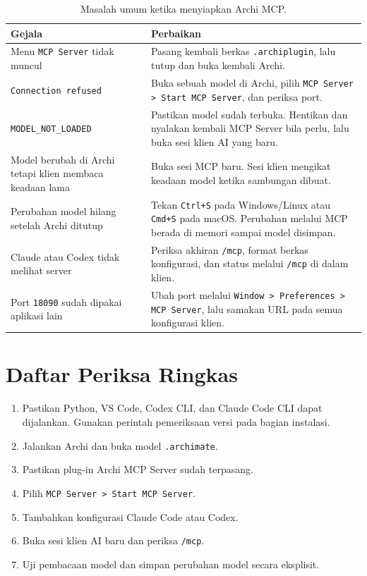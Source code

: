 \begin{table}[htbp]
\centering
\scriptsize
\caption{Masalah umum ketika menyiapkan Archi MCP.}
\label{tab:archi-mcp-troubleshooting}
\begin{tabularx}{\textwidth}{@{}p{} X@{}}
\hline
\textbf{Gejala} & \textbf{Perbaikan} \\
\hline
Menu \texttt{MCP Server} tidak muncul & Pasang kembali berkas
\texttt{.archiplugin}, lalu tutup dan buka kembali Archi. \\
\texttt{Connection refused} & Buka sebuah model di Archi, pilih
\texttt{MCP Server > Start MCP Server}, dan periksa port. \\
\texttt{MODEL\_NOT\_LOADED} & Pastikan model sudah terbuka. Hentikan dan
nyalakan kembali MCP Server bila perlu, lalu buka sesi klien AI yang baru. \\
Model berubah di Archi tetapi klien membaca keadaan lama & Buka sesi MCP baru.
Sesi klien mengikat keadaan model ketika sambungan dibuat. \\
Perubahan model hilang setelah Archi ditutup & Tekan \texttt{Ctrl+S} pada
Windows/Linux atau \texttt{Cmd+S} pada macOS. Perubahan melalui MCP berada di
memori sampai model disimpan. \\
Claude atau Codex tidak melihat server & Periksa akhiran
\texttt{/mcp}, format berkas konfigurasi, dan status melalui \texttt{/mcp} di
dalam klien. \\
Port \texttt{18090} sudah dipakai aplikasi lain & Ubah port melalui
\texttt{Window > Preferences > MCP Server}, lalu samakan URL pada semua
konfigurasi klien. \\
\hline
\end{tabularx}
\end{table}

\section{Daftar Periksa Ringkas}

\begin{enumerate}
  \item Pastikan Python, VS Code, Codex CLI, dan Claude Code CLI dapat
        dijalankan. Gunakan perintah pemeriksaan versi pada bagian instalasi.
  \item Jalankan Archi dan buka model \texttt{.archimate}.
  \item Pastikan plug-in Archi MCP Server sudah terpasang.
  \item Pilih \texttt{MCP Server > Start MCP Server}.
  \item Tambahkan konfigurasi Claude Code atau Codex.
  \item Buka sesi klien AI baru dan periksa \texttt{/mcp}.
  \item Uji pembacaan model dan simpan perubahan model secara eksplisit.
\end{enumerate}
